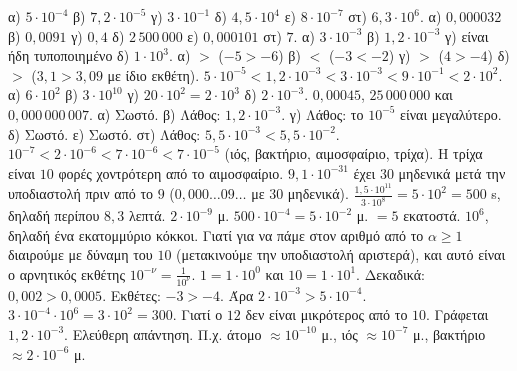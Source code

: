  α) $5\cdot10^{-4}$ \quad β) $7{,}2\cdot10^{-5}$ \quad γ) $3\cdot10^{-1}$ \quad δ) $4{,}5\cdot10^{4}$ \quad ε) $8\cdot10^{-7}$ \quad στ) $6{,}3\cdot10^{6}$.
 α) $0{,}000032$ \quad β) $0{,}0091$ \quad γ) $0{,}4$ \quad δ) $2\,500\,000$ \quad ε) $0{,}000101$ \quad στ) $7$.
 α) $3\cdot10^{-3}$ \quad β) $1{,}2\cdot10^{-3}$ \quad γ) είναι ήδη τυποποιημένο \quad δ) $1\cdot10^{3}$.
 α) $>$ ($-5>-6$) \quad β) $<$ ($-3<-2$) \quad γ) $>$ ($4>-4$) \quad δ) $>$ ($3{,}1>3{,}09$ με ίδιο εκθέτη).
 $5\cdot10^{-5}<1{,}2\cdot10^{-3}<3\cdot10^{-3}<9\cdot10^{-1}<2\cdot10^{2}$.
 α) $6\cdot10^{2}$ \quad β) $3\cdot10^{10}$ \quad γ) $20\cdot10^{2}=2\cdot10^{3}$ \quad δ) $2\cdot10^{-3}$.
 $0{,}00045$, $25\,000\,000$ και $0{,}000\,000\,007$.
 α) Σωστό. β) Λάθος: $1{,}2\cdot10^{-3}$. γ) Λάθος: το $10^{-5}$ είναι μεγαλύτερο. δ) Σωστό. ε) Σωστό. στ) Λάθος: $5{,}5\cdot10^{-3}<5{,}5\cdot10^{-2}$.
 $10^{-7}<2\cdot10^{-6}<7\cdot10^{-6}<7\cdot10^{-5}$ (ιός, βακτήριο, αιμοσφαίριο, τρίχα). Η τρίχα είναι $10$ φορές χοντρότερη από το αιμοσφαίριο.
 $9{,}1\cdot10^{-31}$ έχει $30$ μηδενικά μετά την υποδιαστολή πριν από το $9$ ($0{,}000\ldots09\ldots$ με $30$ μηδενικά).
 $\frac{1{,}5\cdot10^{11}}{3\cdot10^{8}}=5\cdot10^{2}=500$ s, δηλαδή περίπου $8{,}3$ λεπτά.
 $2\cdot10^{-9}$ μ.
 $500\cdot10^{-4}=5\cdot10^{-2}$ μ. $=5$ εκατοστά.
 $10^{6}$, δηλαδή ένα εκατομμύριο κόκκοι.
 Γιατί για να πάμε στον αριθμό από το $\alpha\ge1$ διαιρούμε με δύναμη του $10$ (μετακινούμε την υποδιαστολή αριστερά), και αυτό είναι ο αρνητικός εκθέτης $10^{-\nu}=\frac{1}{10^\nu}$.
 $1=1\cdot10^{0}$ και $10=1\cdot10^{1}$.
 Δεκαδικά: $0{,}002>0{,}0005$. Εκθέτες: $-3>-4$. Άρα $2\cdot10^{-3}>5\cdot10^{-4}$.
 $3\cdot10^{-4}\cdot10^{6}=3\cdot10^{2}=300$.
 Γιατί ο $12$ δεν είναι μικρότερος από το $10$. Γράφεται $1{,}2\cdot10^{-3}$.
 Ελεύθερη απάντηση. Π.χ. άτομο $\approx10^{-10}$ μ., ιός $\approx10^{-7}$ μ., βακτήριο $\approx2\cdot10^{-6}$ μ.
